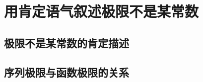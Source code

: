 \section{用肯定语气叙述极限不是某常数}
\subsection{极限不是某常数的肯定描述}
\subsection{序列极限与函数极限的关系}
\begin{exercise}
\item
\end{exercise}
\begin{exercise*}
\item
\end{exercise*}



\endinput
